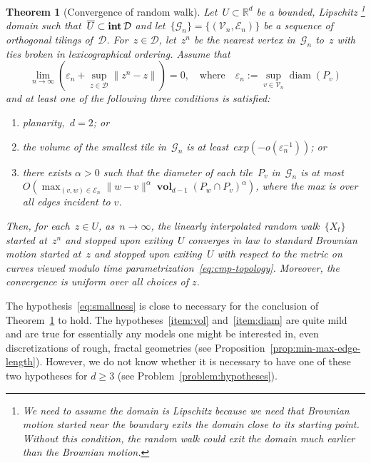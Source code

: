 \documentclass[12pt]{amsart}
\numberwithin{equation}{section}
\DeclareMathOperator{\diam}{{\mathop{diam}}}
\DeclareMathOperator{\intr}{\mathop{\bf int}}
\newtheorem{theoremA}{Theorem}[section]
\newcommand*{\Rd}{\ensuremath{\mathbb{R}^d}}
\newcommand{\G}{\mathcal{G}}
\newcommand{\V}{\mathcal{V}}
\newcommand{\E}{\mathcal{E}}
\newcommand{\eps}{\varepsilon}
\DeclareMathOperator{\vol}{\mathbf{vol}}
\begin{document}
\begin{theoremA}[Convergence of random walk] \label{theorem:convergence-of-rw-trace}
	Let~$U \subset \Rd$ be a bounded, Lipschitz \footnote{We need to assume the domain is Lipschitz because we need that Brownian motion started near the boundary exits the domain close to its starting point. Without this condition, the random walk could exit the domain much earlier than the Brownian motion.} 
domain such that~$\overline{U}\subset \intr\mathcal{D}$ and let~$\{\G_n\} = \{(\V_n, \E_n)\}$ 	be a sequence of orthogonal tilings of~$\mathcal{D}$. For~$z \in \mathcal{D}$, let~$z^{n}$ be the nearest
	vertex in~$\G_n$ to~$z$ with ties broken in lexicographical ordering. Assume that  
	\begin{equation}
		\label{eq:smallness}
	 \lim_{n \to \infty} \left( \eps_n + \sup_{z \in \mathcal{D}} \|z^{n} - z\| \right) = 0  , \quad \text{where} \quad
	 \eps_n := \sup_{v \in \V_n} \diam(P_v)  
	\end{equation}
	and at least one of the following three conditions is satisfied:
	\begin{enumerate}[label = (\Roman*)]
		\item planarity,~$d = 2$; or \label{item:planarity}
		\item the volume of the smallest tile in~$\G_n$ is at least~$exp( -o(\eps_n^{-1}))$; or \label{item:vol}
		\item there exists $\alpha> 0$ such that the diameter of each tile~$P_v$ in~$\G_n$ is at most \\ $O(\max_{(v,w) \in \E_n} \|w-v\|^{\alpha} \vol_{d-1}(P_w \cap P_v)^{\alpha})$, where the max is over all edges incident to $v$. 
		  \label{item:diam}
	\end{enumerate}
	Then, for each~$z \in U$, as~$n \to \infty$, the linearly interpolated random walk~$\{X_t\}$
	started at~$z^{n}$ and stopped upon exiting~$U$ 
	converges in law to standard Brownian motion started at~$z$ and stopped upon exiting~$U$ with respect to the metric on curves viewed modulo time parametrization~\eqref{eq:cmp-topology}. Moreover, the convergence is uniform over all choices of $z$.
\end{theoremA}



The hypothesis~\eqref{eq:smallness} is close to necessary for the conclusion of Theorem~\ref{theorem:convergence-of-rw-trace} to hold. 
The hypotheses~\ref{item:vol} and~\ref{item:diam} are quite mild and are true for essentially any models one might be interested in, even discretizations of rough, fractal geometries (see Proposition~\ref{prop:min-max-edge-length}). However, we do not know whether it is necessary to have one of these two hypotheses for $d\geq 3$ (see Problem~\ref{problem:hypotheses}).
\end{document}
